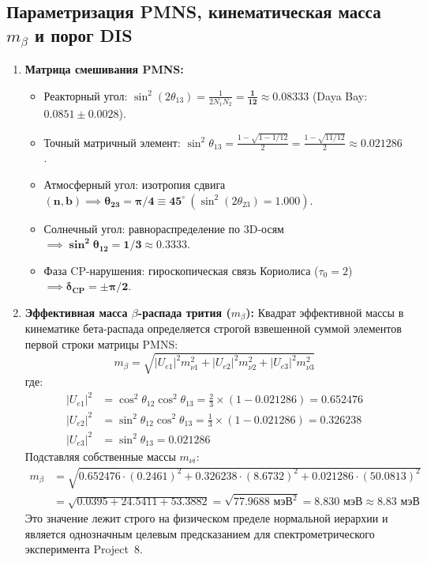 \documentclass[12pt,a4paper]{article}
\begin{document}
\subsection{Параметризация PMNS, кинематическая масса $m_\beta$ и порог DIS}
\begin{enumerate}
	\item \textbf{Матрица смешивания PMNS:}
	\begin{itemize}
		\item Реакторный угол: $\sin^2(2\theta_{13}) = \frac{1}{2 N_1 N_2} = \mathbf{\frac{1}{12}} \approx \mathbf{0.08333}$ (Daya Bay: $0.0851 \pm 0.0028$).
		\item Точный матричный элемент: $\sin^2\theta_{13} = \frac{1 - \sqrt{1 - 1/12}}{2} = \frac{1 - \sqrt{11/12}}{2} \approx \mathbf{0.021286}$.
		\item Атмосферный угол: изотропия сдвига $(\mathbf{n}, \mathbf{b}) \implies \mathbf{\theta_{23} = \pi/4 \equiv 45^\circ} \ (\sin^2(2\theta_{23}) = 1.000)$.
		\item Солнечный угол: равнораспределение по 3D-осям $\implies \mathbf{\sin^2\theta_{12} = 1/3} \approx 0.3333$.
		\item Фаза CP-нарушения: гироскопическая связь Кориолиса ($\tau_0=2$) $\implies \mathbf{\delta_{CP} = \pm \pi/2}$.
	\end{itemize}
	
	\item \textbf{Эффективная масса $\beta$-распада трития ($m_\beta$):}
	Квадрат эффективной массы в кинематике бета-распада определяется строгой взвешенной суммой элементов первой строки матрицы PMNS:
	\begin{equation}
		m_\beta = \sqrt{|U_{e1}|^2 m_{\nu 1}^2 + |U_{e2}|^2 m_{\nu 2}^2 + |U_{e3}|^2 m_{\nu 3}^2}
	\end{equation}
	где:
	\begin{align}
		|U_{e1}|^2 &= \cos^2\theta_{12} \cos^2\theta_{13} = \frac{2}{3} \times (1 - 0.021286) = \mathbf{0.652476} \\
		|U_{e2}|^2 &= \sin^2\theta_{12} \cos^2\theta_{13} = \frac{1}{3} \times (1 - 0.021286) = \mathbf{0.326238} \\
		|U_{e3}|^2 &= \sin^2\theta_{13} = \mathbf{0.021286}
	\end{align}
	Подставляя собственные массы $m_{\nu i}$:
	\begin{align}
		m_\beta &= \sqrt{0.652476 \cdot (0.2461)^2 + 0.326238 \cdot (8.6732)^2 + 0.021286 \cdot (50.0813)^2} \nonumber \\
		&= \sqrt{0.0395 + 24.5411 + 53.3882} = \sqrt{77.9688 \text{ мэВ}^2} = \mathbf{8.830 \text{ мэВ}} \approx \mathbf{8.83 \text{ мэВ}}
	\end{align}
	Это значение лежит строго на физическом пределе нормальной иерархии и является однозначным целевым предсказанием для спектрометрического эксперимента Project~8.
	

\end{enumerate}
\end{document}
